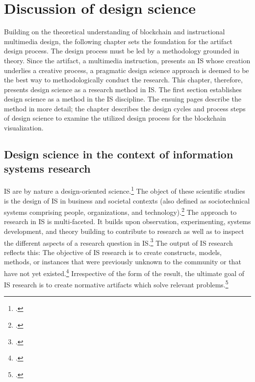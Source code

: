 \chapter{Discussion of design science} \label{chap:DesignScience}

Building on the theoretical understanding of blockchain and instructional multimedia design, the following chapter sets the foundation for the artifact design process. The design process must be led by a methodology grounded in theory. Since the artifact, a multimedia instruction, presents an \ac{IS} whose creation underlies a creative process, a pragmatic design science approach is deemed to be the best way to methodologically conduct the research. This chapter, therefore, presents design science as a research method in \ac{IS}. The first section establishes design science as a method in the \ac{IS} discipline. The ensuing pages describe the method in more detail; the chapter describes the design cycles and process steps of design science to examine the utilized design process for the blockchain visualization.

\section{Design science in the context of information systems research} \label{DesignScienceInISR}

\acf{IS} are by nature a design-oriented science.\footcites[Cf. in addition][]{OsterleGestaltungsorientierteWirtschaftsinformatikPladoyer2010} The object of these scientific studies is the design of \ac{IS} in business and societal contexts (also defined as sociotechnical systems comprising people, organizations, and technology).\footcites[Cf.][p.671]{OsterleMemorandumzurgestaltungsorientierten2010}[cf.][p.98]{HevnerDesignScienceResearch2004}[cf.][p.11]{OsterleGestaltungsorientierteWirtschaftsinformatikPladoyer2010}[cf.][p.252]{MarchDesignnaturalscience1995}
The approach to research in \ac{IS} is multi-faceted. It builds upon observation, experimenting, systems development, and theory building to contribute to research as well as to inspect the different aspects of a research question in \ac{IS}.\footcite[Cf.][p.86]{NunamakerSystemsdevelopmentInformation1991} The output of \ac{IS} research reflects this: The objective of \ac{IS} research is to create constructs, models, methods, or instances that were previously unknown to the community or that have not yet existed.\footcites[Cf.][p.12]{OsterleGestaltungsorientierteWirtschaftsinformatikPladoyer2010}[cf.][p.130]{ThomasBekannteundweniger2014} 
Irrespective of the form of the result, the ultimate goal of \ac{IS} research is to create normative artifacts which solve relevant problems.\footcite[Cf.][p.130]{ThomasBekannteundweniger2014}

